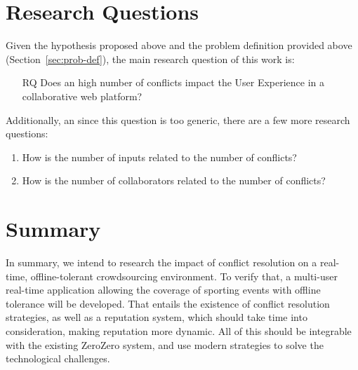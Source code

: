 \section{Research Questions}\label{sec:research-questions}

Given the hypothesis proposed above and the problem definition provided above (Section~\ref{sec:prob-def}), the main research question of this work is:

\begin{enumerate}[leftmargin  = 3.25\parindent, align=left]
    \item[RQ] Does an high number of conflicts impact the User Experience in a collaborative web platform?
\end{enumerate}

Additionally, an since this question is too generic, there are a few more research questions: 
\begin{enumerate}[leftmargin  = 3.25\parindent, align=left, label=RQ\arabic*, start=1]
    \item How is the number of inputs related to the number of conflicts?
    \item How is the number of collaborators related to the number of conflicts?
\end{enumerate}

\section{Summary}

In summary, we intend to research the impact of conflict resolution on a real-time, offline-tolerant crowdsourcing environment. To verify that, a multi-user real-time application allowing the coverage of sporting events with offline tolerance will be developed. That entails the existence of conflict resolution strategies, as well as a reputation system, which should take time into consideration, making reputation more dynamic. All of this should be integrable with the existing ZeroZero system, and use modern strategies to solve the technological challenges.

